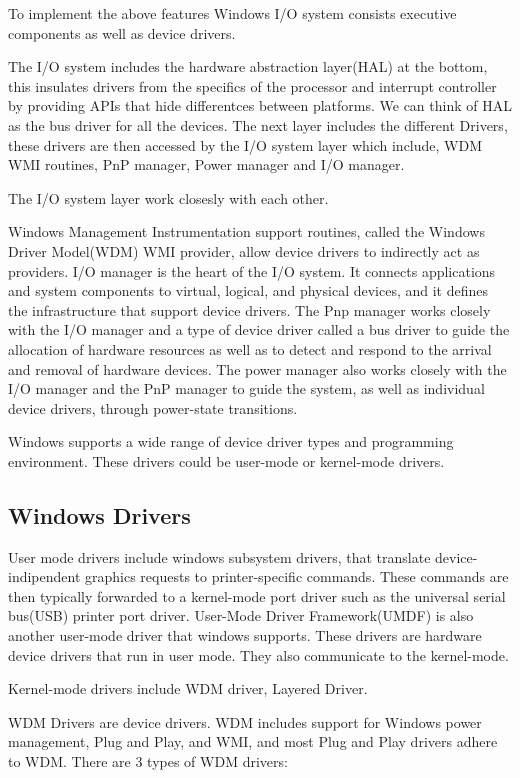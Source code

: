 \documentclass[letterpaper,10pt,draftclsnofoot,onecolumn]{IEEEtran}
\begin{document}
To implement the above features Windows I/O system consists executive components as well as device drivers.

The I/O system includes the hardware abstraction layer(HAL) at the bottom, this insulates drivers from the specifics of the processor and interrupt controller by providing APIs that hide differentces between platforms. We can think of HAL as the bus driver for all the devices. The next layer includes the different Drivers, these drivers are then accessed by the I/O system layer which include, WDM WMI routines, PnP manager, Power manager and I/O manager.

The I/O system layer work closesly with each other.

Windows Management Instrumentation support routines, called the Windows Driver Model(WDM) WMI provider, allow device drivers to indirectly act as providers. I/O manager is the heart of the I/O system. It connects applications and system components to virtual, logical, and physical devices, and it defines the infrastructure that support device drivers. The Pnp manager works closely with the I/O manager and a type of device driver called a bus driver to guide the allocation of hardware resources as well as to detect and respond to the arrival and removal of hardware devices. The power manager also works closely with the I/O manager and the PnP manager to guide the system, as well as individual device drivers, through power-state transitions.

Windows supports a wide range of device driver types and programming environment. These drivers could be user-mode or kernel-mode drivers.

\subsection*{Windows Drivers}

User mode drivers include windows subsystem drivers, that translate device-indipendent graphics requests to printer-specific commands. These commands are then typically forwarded to a kernel-mode port driver such as the universal serial bus(USB) printer port driver. User-Mode Driver Framework(UMDF) is also another user-mode driver that windows supports. These drivers are hardware device drivers that run in user mode. They also communicate to the kernel-mode. 

Kernel-mode drivers include WDM driver, Layered Driver. 

WDM Drivers are device drivers. WDM includes support for Windows power management, Plug and Play, and WMI, and most Plug and Play drivers adhere to WDM. There are 3 types of WDM drivers:\cite{[1]}
\end{document}
